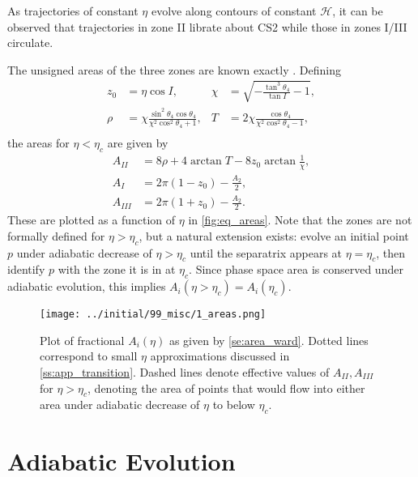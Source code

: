 \documentclass[
        fleqn,
        usenatbib,
    ]{mnras}
\newcommand*{\p}[1]{\left(#1\right)}
\begin{document}
As trajectories of constant $\eta$ evolve along contours of constant
$\mathcal{H}$, it can be observed that trajectories in zone II librate about CS2
while those in zones I/III circulate.

The unsigned areas of the three zones are known exactly
\citep{henrard1987,ward2004I}. Defining
\begin{align*}
    z_0 &= \eta\cos I, &
    \chi &= \sqrt{-\frac{\tan^3\theta_4}{\tan I} - 1},\\
    \rho &= \chi \frac{\sin^2 \theta_4\cos \theta_4}{
        \chi^2 \cos^2\theta_4 + 1},&
    T &= 2\chi \frac{\cos \theta_4}{
        \chi^2 \cos^2\theta_4 - 1},\\
\end{align*}
the areas for $\eta < \eta_c$ are given by
\begin{subequations}\label{se:area_ward}
    \begin{align}
        A_{II} &= 8\rho + 4\arctan T - 8z_0 \arctan \frac{1}{\chi},\\
        A_I &= 2\pi\p{1 - z_0} - \frac{A_2}{2},\\
        A_{III} &= 2\pi\p{1 + z_0} - \frac{A_2}{2}.
    \end{align}
\end{subequations}
These are plotted as a function of $\eta$ in \autoref{fig:eq_areas}. Note that
the zones are not formally defined for $\eta > \eta_c$, but a natural extension
exists: evolve an initial point $p$ under adiabatic decrease of $\eta > \eta_c$
until the separatrix appears at $\eta = \eta_c$, then identify $p$ with the zone
it is in at $\eta_c$. Since phase space area is conserved under adiabatic
evolution, this implies $A_i\p{\eta > \eta_c} = A_i(\eta_c)$.
\begin{figure}
    \centering
    \texttt{[image: ../initial/99\_misc/1\_areas.png]}
    \caption{Plot of fractional $A_{i}(\eta)$ as given by
    \autoref{se:area_ward}. Dotted lines correspond to small $\eta$
    approximations discussed in \autoref{ss:app_transition}. Dashed lines denote
    effective values of $A_{II}, A_{III}$ for $\eta > \eta_c$, denoting the
    area of points that would flow into either area under adiabatic decrease of
    $\eta$ to below $\eta_c$.}\label{fig:eq_areas}
\end{figure}

\section{Adiabatic Evolution}\label{s:ad}
\end{document}
